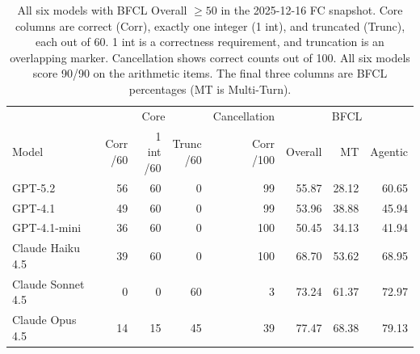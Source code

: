 \begin{table}[t]
\centering
\small
\setlength{\tabcolsep}{4pt}
\begin{tabular}{lrrrrrrr}
\toprule
 & \multicolumn{3}{c}{Core} & Cancellation & \multicolumn{3}{c}{BFCL} \\
\cmidrule(lr){2-4}\cmidrule(lr){5-5}\cmidrule(lr){6-8}
Model & \shortstack{Corr\\/60} & \shortstack{1 int\\/60} & \shortstack{Trunc\\/60} & \shortstack{Corr\\/100} & Overall & MT & Agentic \\
\midrule
GPT-5.2 & 56 & 60 & 0 & 99 & 55.87 & 28.12 & 60.65 \\
GPT-4.1 & 49 & 60 & 0 & 99 & 53.96 & 38.88 & 45.94 \\
GPT-4.1-mini & 36 & 60 & 0 & 100 & 50.45 & 34.13 & 41.94 \\
Claude Haiku 4.5 & 39 & 60 & 0 & 100 & 68.70 & 53.62 & 68.95 \\
Claude Sonnet 4.5 & 0 & 0 & 60 & 3 & 73.24 & 61.37 & 72.97 \\
Claude Opus 4.5 & 14 & 15 & 45 & 39 & 77.47 & 68.38 & 79.13 \\
\bottomrule
\end{tabular}
\caption{All six models with BFCL Overall $\geq 50$ in the 2025-12-16 FC snapshot. Core columns are correct (Corr), exactly one integer (1 int), and truncated (Trunc), each out of 60. 1 int is a correctness requirement, and truncation is an overlapping marker. Cancellation shows correct counts out of 100. All six models score 90/90 on the arithmetic items. The final three columns are BFCL percentages (MT is Multi-Turn).}
\label{tab:high-subset-scores}
\end{table}
